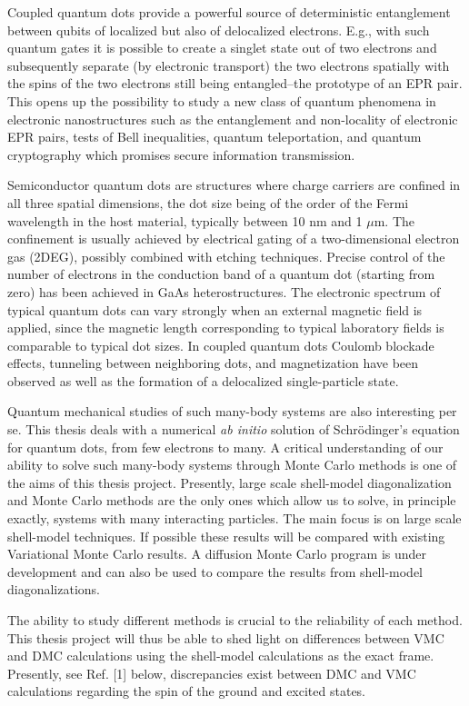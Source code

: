 Coupled quantum dots provide a powerful source of 
deterministic entanglement between qubits of localized 
but also of delocalized electrons. E.g., with such quantum gates it is
possible to create a singlet state out of two electrons 
and subsequently separate (by electronic transport) 
the two electrons spatially with the spins of the two electrons still being
entangled--the prototype of an EPR pair. 
This opens up the possibility to study a new class 
of quantum phenomena in electronic nanostructures 
such as the entanglement and
non-locality of electronic EPR pairs, tests of Bell inequalities, 
quantum teleportation, and quantum cryptography 
which promises secure information transmission. 


Semiconductor quantum dots are structures where
charge carriers are confined in all three spatial dimensions, 
the dot size being of the order of the Fermi wavelength 
in the host material, typically between  10 nm and  1 $\mu$m.
The confinement is usually achieved by electrical gating of a 
two-dimensional electron gas (2DEG), 
possibly combined with etching techniques. Precise control of the
number of electrons in the conduction band of a quantum dot 
(starting from zero) has been achieved in GaAs heterostructures. 
The electronic spectrum of typical quantum dots
can vary strongly when an external magnetic field is applied, 
since the magnetic length corresponding to typical 
laboratory fields  is comparable to typical dot sizes.
In coupled quantum dots Coulomb blockade effects, 
tunneling between neighboring dots, and magnetization 
have been observed as well as the formation of a
delocalized single-particle state. 


Quantum mechanical studies of such many-body systems are also
interesting per se. 
This thesis deals with a numerical {\em ab initio}  solution of  
Schr\"odinger's equation for quantum dots, from few electrons to many.
A critical understanding of our ability 
to solve such many-body systems through Monte Carlo methods is one 
of the aims
of this thesis project. Presently, large scale shell-model diagonalization and
Monte Carlo methods are
the only ones which allow us to solve, in principle exactly, 
systems with many interacting particles. 
The main focus is on large scale shell-model techniques. If possible these results will be compared 
with existing Variational Monte Carlo results. A diffusion Monte Carlo program is under 
development and can also be used to compare the results from shell-model diagonalizations.

The ability to study different methods is crucial to the reliability of each method.
This thesis project will thus be able to shed light on differences between VMC and DMC calculations
using the shell-model calculations as the exact frame. Presently, see Ref. [1] below, discrepancies exist between DMC and VMC calculations regarding the spin of the ground  and excited states. 

